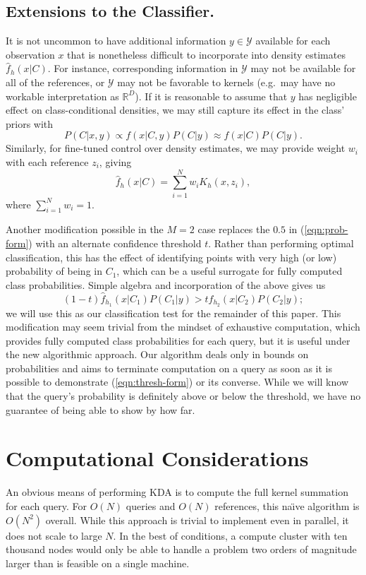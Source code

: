 \documentclass[twoside,leqno,twocolumn]{article}
\begin{document}
\subsection{Extensions to the Classifier.}
It is not uncommon to have additional information $y \in \mathcal{Y}$
available for each observation $x$ that is nonetheless difficult to
incorporate into density estimates $\widehat{f}_h(x|C)$.  For
instance, corresponding information in $\mathcal{Y}$ may not be
available for all of the references, or $\mathcal{Y}$ may not be
favorable to kernels (e.g.~may have no workable interpretation as
$\mathbb{R}^D$).  If it is reasonable to assume that $y$ has
negligible effect on class-conditional densities, we may still capture
its effect in the class' priors with
\begin{equation}
  P(C|x,y) \propto f(x|C,y)P(C|y) \approx f(x|C)P(C|y) .
\end{equation}
Similarly, for fine-tuned control over density estimates, we may
provide weight $w_i$ with each reference $z_i$, giving
\begin{equation}
  \widehat{f}_h(x|C) = \sum_{i=1}^N w_i K_h(x,z_i) ,
\end{equation}
where $\sum_{i=1}^N w_i = 1$.

Another modification possible in the $M = 2$ case replaces the $0.5$
in (\ref{eqn:prob-form}) with an alternate confidence threshold $t$.
Rather than performing optimal classification, this has the effect of
identifying points with very high (or low) probability of being in
$C_1$, which can be a useful surrogate for fully computed class
probabilities.  Simple algebra and incorporation of the above gives us
\begin{equation}\label{eqn:thresh-form}
  (1 - t)\widehat{f}_{h_1}(x|C_1)P(C_1|y) > t\widehat{f}_{h_2}(x|C_2)P(C_2|y) ;
\end{equation}
we will use this as our classification test for the remainder of this
paper.  This modification may seem trivial from the mindset of
exhaustive computation, which provides fully computed class
probabilities for each query, but it is useful under the new
algorithmic approach.  Our algorithm deals only in bounds on
probabilities and aims to terminate computation on a query as soon as
it is possible to demonstrate (\ref{eqn:thresh-form}) or its converse.
While we will know that the query's probability is definitely above or
below the threshold, we have no guarantee of being able to show by how
far.

\section{Computational Considerations}
An obvious means of performing KDA is to compute the full kernel
summation for each query.  For $O(N)$ queries and $O(N)$ references,
this na\"{\i}ve algorithm is $O(N^2)$ overall.  While this approach is
trivial to implement even in parallel, it does not scale to large $N$.
In the best of conditions, a compute cluster with ten thousand nodes
would only be able to handle a problem two orders of magnitude larger
than is feasible on a single machine.
\end{document}
